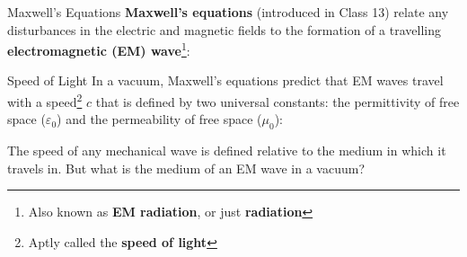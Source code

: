 \documentclass[12pt,compress,aspectratio=169]{beamer}
\begin{document}
\begin{frame}{Maxwell's Equations}
  \textbf{Maxwell's equations} (introduced in Class 13) relate any disturbances
  in the electric and magnetic fields to the formation of a travelling
  \textbf{electromagnetic (EM) wave}\footnote{Also known as \textbf{EM
    radiation}, or just \textbf{radiation}}:

\end{frame}



\begin{frame}{Speed of Light}
  In a vacuum, Maxwell's equations predict that EM waves travel with a
  speed\footnote{Aptly called the \textbf{speed of light}} $c$ that is defined
  by two universal constants: the permittivity of free space ($\varepsilon_0$)
  and the permeability of free space ($\mu_0$):


  The speed of any mechanical wave is defined relative to the medium in which
  it travels in. But what is the medium of an EM wave in a vacuum?
\end{frame}
\end{document}
